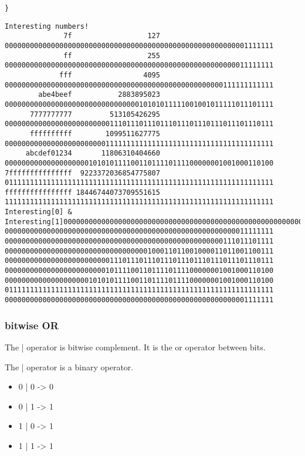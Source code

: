 \documentclass[11pt]{article}
\begin{document}
\begin{enumerate}
\begin{enumerate}
\begin{verbatim}
}

\end{verbatim}

\begin{verbatim}
Interesting numbers!
              7f                  127 0000000000000000000000000000000000000000000000000000000001111111
              ff                  255 0000000000000000000000000000000000000000000000000000000011111111
             fff                 4095 0000000000000000000000000000000000000000000000000000111111111111
        abe4beef           2883895023 0000000000000000000000000000000010101011111001001011111011101111
      7777777777         513105426295 0000000000000000000000000111011101110111011101110111011101110111
      ffffffffff        1099511627775 0000000000000000000000001111111111111111111111111111111111111111
     abcdef01234       11806310404660 0000000000000000000010101011110011011110111100000001001000110100
7fffffffffffffff  9223372036854775807 0111111111111111111111111111111111111111111111111111111111111111
ffffffffffffffff 18446744073709551615 1111111111111111111111111111111111111111111111111111111111111111
Interesting[0] & Interesting[1]0000000000000000000000000000000000000000000000000000000001111111
0000000000000000000000000000000000000000000000000000000011111111
0000000000000000000000000000000000000000000000000000111011101111
0000000000000000000000000000000000100011011001000011011001100111
0000000000000000000000000111011101110111011101110111011101110111
0000000000000000000000001011110011011110111100000001001000110100
0000000000000000000010101011110011011110111100000001001000110100
0111111111111111111111111111111111111111111111111111111111111111
0000000000000000000000000000000000000000000000000000000001111111
\end{verbatim}
\end{enumerate}
\end{enumerate}



\subsubsection{bitwise OR}
\label{sec:org0c8838b}

The | operator is bitwise complement. It is the or operator between
bits. 

The | operator is a binary operator.

\begin{itemize}
\item 0 | 0 -> 0
\item 0 | 1 -> 1
\item 1 | 0 -> 1
\item 1 | 1 -> 1
\end{itemize}
\end{document}

